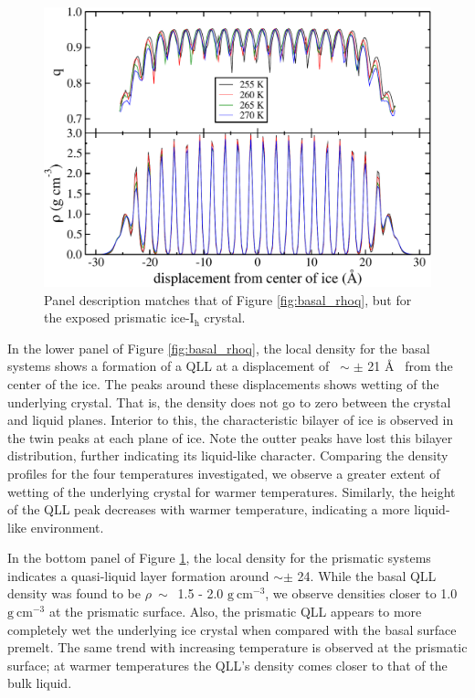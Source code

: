 \begin{figure}
\includegraphics[width=\linewidth]{Figures/prism_rhoq}
\caption{\label{fig:prism_rhoq} Panel description matches that of
  Figure \ref{fig:basal_rhoq}, but for the exposed prismatic
  ice-I$_\mathrm{h}$ crystal. }
\end{figure}                

In the lower panel of Figure \ref{fig:basal_rhoq}, the local density
for the basal systems shows a formation of a QLL at a displacement of
$~\sim\pm$ 21 \AA~ from the center of the ice. The peaks around these
displacements shows wetting of the underlying crystal. That is, the
density does not go to zero between the crystal and liquid planes. Interior to
this, the characteristic bilayer of ice is observed in the twin peaks
at each plane of ice. Note the outter peaks have lost this bilayer
distribution, further indicating its liquid-like character. Comparing
the density profiles for the four temperatures investigated, we
observe a greater extent of wetting of the underlying crystal for
warmer temperatures. Similarly, the height of the QLL peak decreases
with warmer temperature, indicating a more liquid-like environment.

In the bottom panel of Figure \ref{fig:prism_rhoq}, the
local density for the prismatic systems indicates a quasi-liquid layer
formation around $\sim\pm$ 24. While the basal QLL density was found
to be $\rho~ \sim$~1.5 - 2.0 $\mathrm{g}~\mathrm{cm}^{-3}$, we observe
densities closer to 1.0 $\mathrm{g}~\mathrm{cm}^{-3}$ at the prismatic
surface. Also, the prismatic QLL appears to more completely wet the underlying
ice crystal when compared with the basal surface premelt. The same
trend with increasing temperature is observed at the prismatic
surface; at warmer temperatures the QLL's density comes closer to
that of the bulk liquid. 


